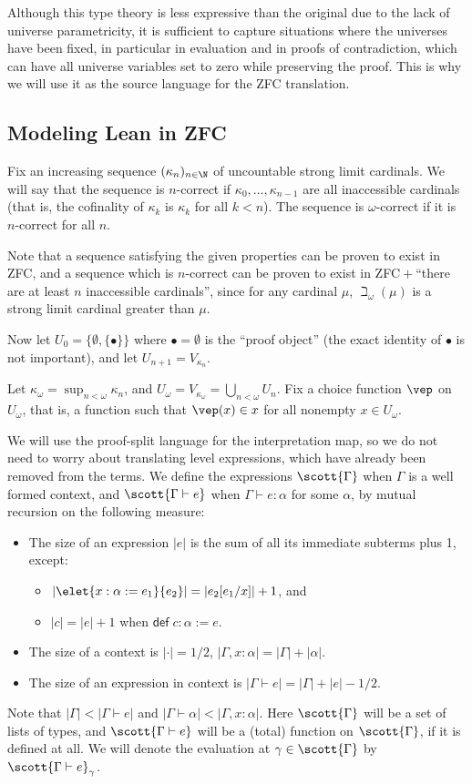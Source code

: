 Although this type theory is less expressive than the original due to the lack of universe parametricity, it is sufficient to capture situations where the universes have been fixed, in particular in evaluation and in proofs of contradiction, which can have all universe variables set to zero while preserving the proof. This is why we will use it as the source language for the ZFC translation.

\subsection{Modeling Lean in ZFC}
Fix an increasing sequence $(\kappa_n)_{n\in\N}$ of uncountable strong limit cardinals. We will say that the sequence is $n$-correct if $\kappa_0,\dots,\kappa_{n-1}$ are all inaccessible cardinals (that is, the cofinality of $\kappa_k$ is $\kappa_k$ for all $k<n$). The sequence is $\omega$-correct if it is $n$-correct for all $n$.

Note that a sequence satisfying the given properties can be proven to exist in ZFC, and a sequence which is $n$-correct can be proven to exist in ZFC${}+{}$``there are at least $n$ inaccessible cardinals'', since for any cardinal $\mu$, $\beth_\omega(\mu)$ is a strong limit cardinal greater than $\mu$.

Now let $U_0=\{\emptyset,\{\bullet\}\}$ where $\bullet=\emptyset$ is the ``proof object'' (the exact identity of $\bullet$ is not important), and let $U_{n+1}=V_{\kappa_n}$.

Let $\kappa_\omega=\operatorname{sup}_{n<\omega}\kappa_n$, and $U_\omega=V_{\kappa_\omega}=\bigcup_{n<\omega} U_n$. Fix a choice function $\vep$ on $U_\omega$, that is, a function such that $\vep(x)\in x$ for all nonempty $x\in U_\omega$.

We will use the proof-split language for the interpretation map, so we do not need to worry about translating level expressions, which have already been removed from the terms. We define the expressions $\scott{\Gamma}$ when $\Gamma$ is a well formed context, and $\scott{\Gamma\vdash e}$ when $\Gamma\vdash e:\alpha$ for some $\alpha$, by mutual recursion on the following measure:
\begin{itemize}
\item The size of an expression $|e|$ is the sum of all its immediate subterms plus 1, except:
\begin{itemize}
\item $|\elet{x:\alpha:=e_1}{e_2}|=|e_2[e_1/x]|+1$, and
\item $|c|=|e|+1$ when $\mathsf{def}\;c:\alpha:=e$.
\end{itemize}
\item The size of a context is $|{\cdot}|=1/2$, $|\Gamma,x:\alpha|=|\Gamma|+|\alpha|$.
\item The size of an expression in context is $|\Gamma\vdash e|=|\Gamma|+|e|-1/2$.
\end{itemize}
Note that $|\Gamma|<|\Gamma\vdash e|$ and $|\Gamma\vdash\alpha|<|\Gamma,x:\alpha|$. Here $\scott{\Gamma}$ will be a set of lists of types, and $\scott{\Gamma\vdash e}$ will be a (total) function on $\scott{\Gamma}$, if it is defined at all. We will denote the evaluation at $\gamma\in\scott{\Gamma}$ by $\scott{\Gamma\vdash e}_\gamma$.

